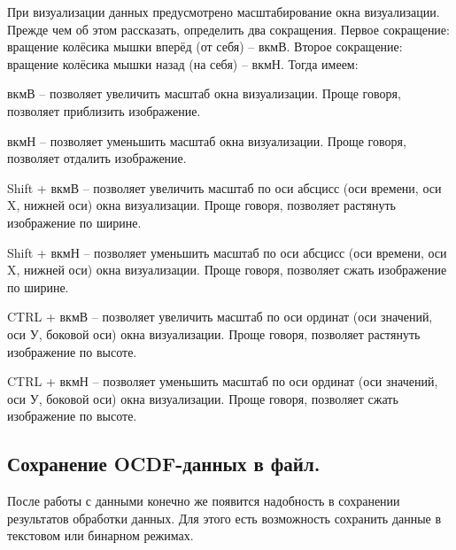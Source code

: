 {\standartFont

  \par При визуализации данных предусмотрено масштабирование окна визуализации. Прежде чем об этом рассказать, определить два сокращения. Первое сокращение: вращение колёсика мышки вперёд (от себя) {--} вкмВ. Второе сокращение: вращение колёсика мышки назад (на себя) {--} вкмН. Тогда имеем:

  \par вкмВ {--} позволяет увеличить масштаб окна визуализации. Проще говоря, позволяет приблизить изображение.

  \par вкмН {--} позволяет уменьшить масштаб окна визуализации. Проще говоря, позволяет отдалить изображение.

  \par Shift + вкмВ {--} позволяет увеличить масштаб по оси абсцисс (оси времени, оси X, нижней оси) окна визуализации. Проще говоря, позволяет растянуть изображение по ширине.

  \par Shift + вкмН {--} позволяет уменьшить масштаб по оси абсцисс (оси времени, оси X, нижней оси) окна визуализации. Проще говоря, позволяет сжать изображение по ширине.

  \par CTRL + вкмВ {--} позволяет увеличить масштаб по оси ординат (оси значений, оси У, боковой оси) окна визуализации. Проще говоря, позволяет растянуть изображение по высоте.

  \par CTRL + вкмН {--} позволяет уменьшить масштаб по оси ординат (оси значений, оси У, боковой оси) окна визуализации. Проще говоря, позволяет сжать изображение по высоте.

  \par
}

\subsection{ \standartTitleFont
  Сохранение OCDF-данных в файл.
} \label{subsubsec:OCDFSafe}

{\standartFont

  \par После работы с данными конечно же появится надобность в сохранении результатов обработки данных. Для этого есть возможность сохранить данные в текстовом или бинарном режимах. 

  \par 
}

